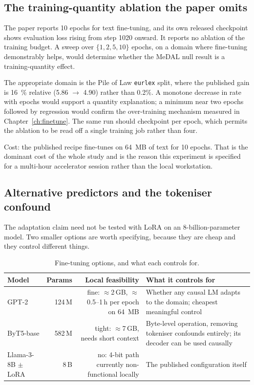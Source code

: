 \documentclass[11pt,a4paper]{article}
\newcommand{\code}[1]{\texttt{\small #1}}
\begin{document}
\subsection{The training-quantity ablation the paper omits}

The paper reports 10 epochs for text fine-tuning, and its own released checkpoint
shows evaluation loss rising from step \num{1020} onward. It reports no ablation
of the training budget. A sweep over $\{1,2,5,10\}$ epochs, on a domain where
fine-tuning demonstrably helps, would determine whether the MeDAL null result is a
training-quantity effect.

The appropriate domain is the Pile of Law \code{eurlex} split, where the published
gain is \SI{16}{\%} relative (\num{5.86} $\to$ \num{4.90}) rather than
\num{0.2}{\%}. A monotone decrease in rate with epochs would support a
quantity explanation; a minimum near two epochs followed by regression would
confirm the over-training mechanism measured in Chapter~\ref{ch:finetune}. The
same run should checkpoint per epoch, which permits the ablation to be read off a
single training job rather than four.

Cost: the published recipe fine-tunes on \SI{64}{MB} of text for 10 epochs. That is
the dominant cost of the whole study and is the reason this experiment is
specified for a multi-hour accelerator session rather than the local workstation.

\subsection{Alternative predictors and the tokeniser confound}

The adaptation claim need not be tested with LoRA on an 8-billion-parameter model.
Two smaller options are worth specifying, because they are cheap and they control
different things.

\begin{table}[htbp]
\centering
\small
\caption{Fine-tuning options, and what each controls for.}
\label{tab:models2}
\begin{tabularx}{\textwidth}{L{2.9cm}rrL{4.4cm}}
\toprule
Model & Params & Local feasibility & What it controls for \\
\midrule
GPT-2 & 124\,M & fine: $\approx$2\,GB, $\approx$0.5--1\,h per epoch on
  \SI{64}{MB} & Whether any causal LM adapts to the domain; cheapest meaningful
  control \\
ByT5-base & 582\,M & tight: $\approx$7\,GB, needs short context &
  Byte-level operation, removing tokeniser confounds entirely; its decoder can be
  used causally \\
Llama-3-8B $\pm$ LoRA & 8\,B & no: 4-bit path currently non-functional locally &
  The published configuration itself \\
\bottomrule
\end{tabularx}
\end{table}
\end{document}

